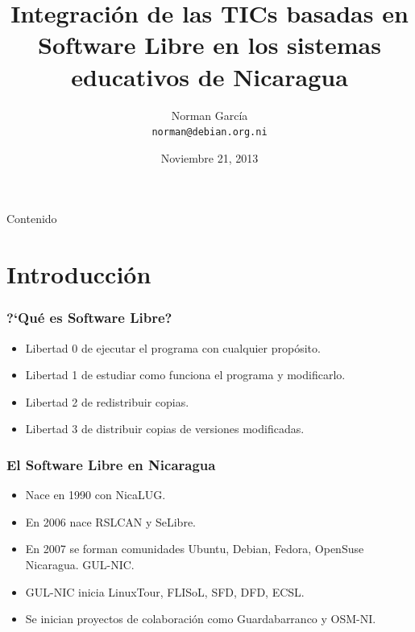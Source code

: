 \documentclass{beamer}
\title{Integraci\'on de las TICs basadas en Software Libre en los sistemas educativos de Nicaragua}
\author[n0rman]{Norman Garc\'ia \\ \texttt{norman@debian.org.ni}}
\institute{Debian Nicaragua}
\date{Noviembre 21, 2013}
\begin{document}
\begin{frame}
	\titlepage
\end{frame}

\begin{frame}{Contenido}
	\tableofcontents
\end{frame}


\section{Introducci\'on}

\begin{frame}
\frametitle{?`Qu\'e es Software Libre?}
        
	\begin{itemize}
                \pause \item Libertad \alert{0} de ejecutar el programa con cualquier prop\'osito.
		\pause \item Libertad \alert{1} de estudiar como funciona el programa y modificarlo.
		\pause \item Libertad \alert{2} de redistribuir copias.
		\pause \item Libertad \alert{3} de distribuir copias de versiones modificadas.
       \end{itemize}

\end{frame}

\begin{frame}
\frametitle{El Software Libre en Nicaragua}    
        \begin{itemize}
                \pause \item Nace en \alert{1990} con NicaLUG.
		\pause \item En \alert{2006} nace RSLCAN y SeLibre.
		\pause \item En \alert{2007} se forman comunidades Ubuntu, Debian, Fedora, OpenSuse Nicaragua. GUL-NIC.
	     	\pause \item GUL-NIC inicia LinuxTour, FLISoL, SFD, DFD, ECSL.
		\pause \item Se inician proyectos de colaboraci\'on como \alert{Guardabarranco} y \alert{OSM-NI}.
    \end{itemize}
\end{frame}
\end{document}
